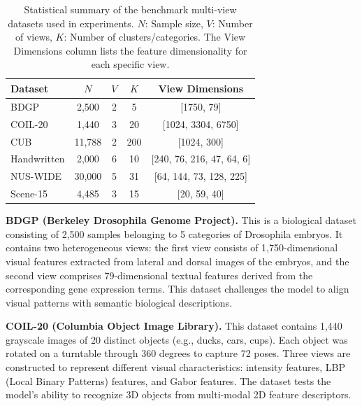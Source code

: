 \documentclass{article}
\theoremstyle{plain}
\theoremstyle{definition}
\theoremstyle{remark}
\begin{document}
\begin{table}[!htbp]
\caption{Statistical summary of the benchmark multi-view datasets used in experiments. $N$: Sample size, $V$: Number of views, $K$: Number of clusters/categories. The View Dimensions column lists the feature dimensionality for each specific view.}
\label{tab:dataset_stats}
\vskip 0.1in
\begin{center}
\begin{small}
\begin{sc}
\begin{tabular}{lcccc}
\toprule
Dataset & $N$ & $V$ & $K$ & View Dimensions \\
\midrule
BDGP        & 2,500  & 2 & 5   & [1750, 79] \\
COIL-20     & 1,440  & 3 & 20  & [1024, 3304, 6750] \\
CUB         & 11,788 & 2 & 200 & [1024, 300] \\
Handwritten & 2,000  & 6 & 10  & [240, 76, 216, 47, 64, 6] \\
NUS-WIDE    & 30,000 & 5 & 31  & [64, 144, 73, 128, 225] \\
Scene-15    & 4,485  & 3 & 15  & [20, 59, 40] \\
\bottomrule
\end{tabular}%
\end{sc}
\end{small}
\end{center}
\vskip -0.1in
\end{table}

\textbf{BDGP (Berkeley Drosophila Genome Project).} This is a biological dataset consisting of 2,500 samples belonging to 5 categories of Drosophila embryos. It contains two heterogeneous views: the first view consists of 1,750-dimensional visual features extracted from lateral and dorsal images of the embryos, and the second view comprises 79-dimensional textual features derived from the corresponding gene expression terms. This dataset challenges the model to align visual patterns with semantic biological descriptions.

\textbf{COIL-20 (Columbia Object Image Library).} This dataset contains 1,440 grayscale images of 20 distinct objects (e.g., ducks, cars, cups). Each object was rotated on a turntable through 360 degrees to capture 72 poses. Three views are constructed to represent different visual characteristics: intensity features, LBP (Local Binary Patterns) features, and Gabor features. The dataset tests the model's ability to recognize 3D objects from multi-modal 2D feature descriptors.
\end{document}
